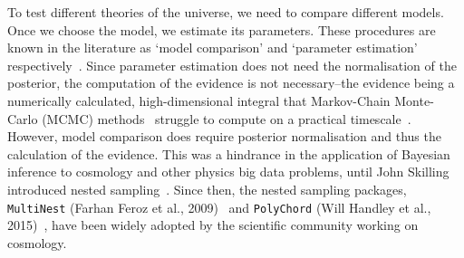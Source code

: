 To test different theories of the universe, we need to compare different models. Once we choose the model, we estimate its parameters. These procedures are known in the literature as `model comparison' and `parameter estimation' respectively~\cite{Bernardo94}. Since parameter estimation does not need the normalisation of the posterior, the computation of the evidence is not necessary--the evidence being a numerically calculated, high-dimensional integral that Markov-Chain Monte-Carlo (MCMC) methods~\cite{mackay2003information} struggle to compute on a practical timescale~\cite{10.1214/06-BA127}. However, model comparison does require posterior normalisation and thus the calculation of the evidence. This was a hindrance in the application of Bayesian inference to cosmology and other physics big data problems, until John Skilling introduced nested sampling~\cite{10.1214/06-BA127}. Since then, the nested sampling packages, \texttt{MultiNest} (Farhan Feroz et al., 2009)~\cite{Feroz_2009} and \texttt{PolyChord} (Will Handley et al., 2015)~\cite{Handley_2015}, have been widely adopted by the scientific community working on cosmology.



